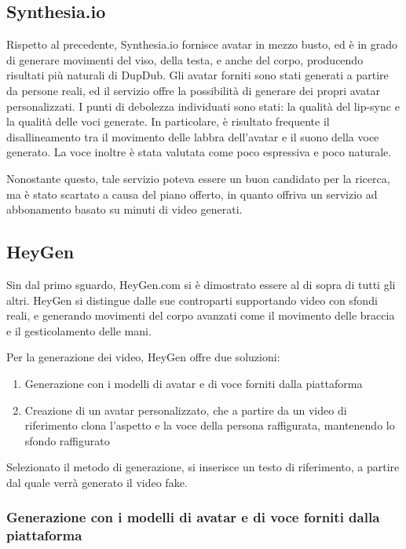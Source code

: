\subsection{Synthesia.io}

Rispetto al precedente, Synthesia.io fornisce avatar in mezzo busto, ed è in grado di generare movimenti del viso, della testa, e anche del corpo, producendo risultati più naturali di DupDub. Gli avatar forniti sono stati generati a partire da persone reali, ed il servizio offre la possibilità di generare dei propri avatar personalizzati. I punti di debolezza individuati sono stati: la qualità del lip-sync e la qualità delle voci generate. In particolare, è risultato frequente il disallineamento tra il movimento delle labbra dell'avatar e il suono della voce generato. La voce inoltre è stata valutata come poco espressiva e poco naturale.

Nonostante questo, tale servizio poteva essere un buon candidato per la ricerca, ma è stato scartato a causa del piano offerto, in quanto offriva un servizio ad abbonamento basato su minuti di video generati.

\subsection{HeyGen}

Sin dal primo sguardo, HeyGen.com si è dimostrato essere al di sopra di tutti gli altri. HeyGen si distingue dalle sue controparti supportando video con sfondi reali, e generando movimenti del corpo avanzati come il movimento delle braccia e il gesticolamento delle mani.

Per la generazione dei video, HeyGen offre due soluzioni:
\begin{enumerate}
    \item Generazione con i modelli di avatar e di voce forniti dalla piattaforma
    \item Creazione di un avatar personalizzato, che a partire da un video di riferimento clona l'aspetto e la voce della persona raffigurata, mantenendo lo sfondo raffigurato
\end{enumerate}

Selezionato il metodo di generazione, si inserisce un testo di riferimento, a partire dal quale verrà generato il video fake.

\subsubsection{Generazione con i modelli di avatar e di voce forniti dalla piattaforma}

